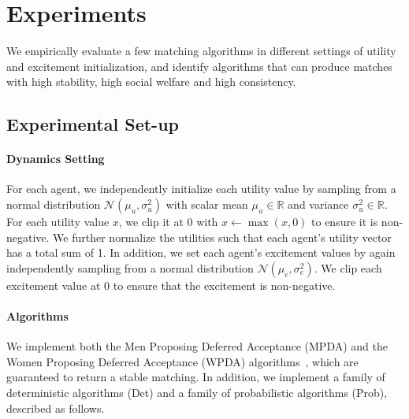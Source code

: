 \section{Experiments}
We empirically evaluate a few matching algorithms in different settings of utility and excitement initialization, and identify algorithms that can produce matches with high stability, high social welfare and high consistency.
\subsection{Experimental Set-up}
\paragraph{Dynamics Setting} For each agent, we independently initialize each utility value by sampling from a normal distribution $\mathcal{N}(\mu_u, \sigma_u^2)$ with scalar mean $\mu_u \in \mathbb{R}$ and variance $\sigma_u^2 \in \mathbb{R}$. For each utility value $x$, we clip it at 0 with $x \leftarrow \max(x, 0)$ to ensure it is non-negative. We further normalize the utilities such that each agent's utility vector has a total sum of 1. In addition, we set each agent's excitement values by again independently sampling from a normal distribution $\mathcal{N}(\mu_e, \sigma_e^2)$. We clip each excitement value at 0 to ensure that the excitement is non-negative.

\paragraph{Algorithms} We implement both the Men Proposing Deferred Acceptance (MPDA) and the Women Proposing Deferred Acceptance (WPDA) algorithms~\cite{galeshapley1962}, which are guaranteed to return a stable matching. In addition, we implement a family of deterministic algorithms (Det) and a family of probabilistic algorithms (Prob), described as follows.

